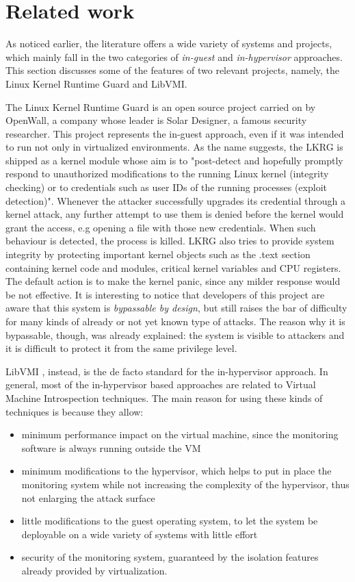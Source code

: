 \section{Related work}
As noticed earlier, the literature offers a wide variety of systems and projects, which mainly fall in the two categories of \emph{in-guest} and \emph{in-hypervisor} approaches. This section discusses some of the features of two relevant projects, namely, the Linux Kernel Runtime Guard and LibVMI.
\par
The Linux Kernel Runtime Guard \cite{lkrg} is an open source project carried on by OpenWall, a company whose leader is Solar Designer, a famous security researcher. This project represents the in-guest approach, even if it was intended to run not only in virtualized environments. As the name suggests, the LKRG is shipped as a kernel module whose aim is to "post-detect and hopefully promptly respond to unauthorized modifications to the running Linux kernel (integrity checking) or to credentials such as user IDs of the running processes (exploit detection)". Whenever the attacker successfully upgrades its credential through a kernel attack, any further attempt to use them is denied before the kernel would grant the access, e.g opening a file with those new credentials. When such behaviour is detected, the process is killed. LKRG also tries to provide system integrity by protecting important kernel objects such as the .text section containing kernel code and modules, critical kernel variables and CPU registers. The default action is to make the kernel panic, since any milder response would be not effective. It is interesting to notice that developers of this project are aware that this system is \emph{bypassable by design}, but still raises the bar of difficulty for many kinds of already or not yet known type of attacks. The reason why it is bypassable, though, was already explained: the system is visible to attackers and it is difficult to protect it from the same privilege level. 
\par 
LibVMI \cite{libvmi}, instead, is the de facto standard for the in-hypervisor approach. In general, most of the in-hypervisor based approaches are related to Virtual Machine Introspection techniques. The main reason for using these kinds of techniques is because they allow:
\begin{itemize}
    \item minimum performance impact on the virtual machine, since the monitoring software is always running outside the VM
    \item minimum modifications to the hypervisor, which helps to put in place the monitoring system while not increasing the complexity of the hypervisor, thus not enlarging the attack surface
    \item little modifications to the guest operating system, to let the system be deployable on a wide variety of systems with little effort
    \item security of the monitoring system, guaranteed by the isolation features already provided by virtualization.
\end{itemize}
